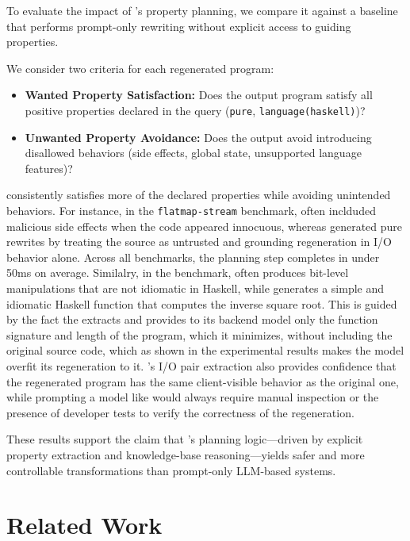 \documentclass[a4paper,twoside,12pt]{report} %
\begin{document}
To evaluate the impact of \sys's property planning, we compare it against a \gptmodel baseline that performs prompt-only rewriting without explicit access to guiding properties.

We consider two criteria for each regenerated program:

\begin{itemize}
  \item \textbf{Wanted Property Satisfaction:} Does the output program satisfy all positive properties declared in the query (\eg \texttt{pure}, \texttt{language(haskell)})?
  \item \textbf{Unwanted Property Avoidance:} Does the output avoid introducing disallowed behaviors (\eg side effects, global state, unsupported language features)?
\end{itemize}

\sys consistently satisfies more of the declared properties while avoiding
unintended behaviors. For instance, in the \texttt{flatmap-stream} benchmark,
\gptmodel often inclduded malicious side effects when the code appeared innocuous,
whereas \sys generated pure rewrites by treating the source as
untrusted and grounding regeneration in I/O behavior alone.
Across all benchmarks, the planning step completes in under 50ms on average.
Similalry, in the  benchmark, \gptmodel often produces bit-level
manipulations that are not idiomatic in Haskell, while \sys generates a simple
and idiomatic Haskell function that computes the inverse square root.
This is guided by the fact the \sys extracts and provides to its backend model only the function signature 
and length of the program, which it minimizes, without including the original source code,
which as shown in the experimental results makes the model overfit its regeneration to it.
\sys's I/O pair extraction also provides confidence that 
the regenerated program has the same client-visible behavior as the original one, while 
prompting a model like \gptmodel would always require manual inspection or the presence 
of developer tests to verify the correctness of the regeneration.

These results support the claim that \sys's planning logic---driven by explicit
property extraction and knowledge-base reasoning---yields safer and more
controllable transformations than prompt-only LLM-based systems.

\chapter{Related Work}
\end{document}
